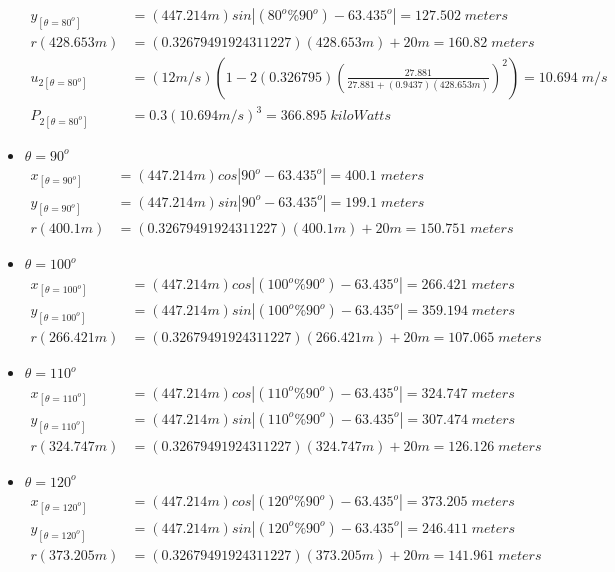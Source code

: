 \begin{itemize}
\begin{align*}
		y_{[\theta=80^o]} &=(447.214m) sin\left| (80^o\%90^o) - 63.435^o \right|  =127.502\;meters \\
		r(428.653m) &=(0.32679491924311227)(428.653m)+20m  =160.82\;meters\\
		u_{2[\theta=80^o]} &=(12m/s)\left( 1-2(0.326795)\left( \frac{27.881}{27.881+(0.9437)(428.653m)} \right)^2 \right) =10.694\;m/s \\
		P_{2[\theta=80^o]} &=0.3(10.694m/s)^3  =366.895\;kiloWatts
\end{align*}
\item $\theta=90^o$
	\begin{align*}%
		x_{[\theta=90^o]} &=(447.214m) cos\left| 90^o - 63.435^o \right|  =400.1\;meters \\
		y_{[\theta=90^o]} &=(447.214m) sin\left| 90^o - 63.435^o \right|  =199.1\;meters \\
		r(400.1m) &=(0.32679491924311227)(400.1m)+20m  =150.751\;meters\end{align*}
\item $\theta=100^o$
	\begin{align*}%
		x_{[\theta=100^o]} &=(447.214m) cos\left| (100^o\%90^o) - 63.435^o \right|  =266.421\;meters \\
		y_{[\theta=100^o]} &=(447.214m) sin\left| (100^o\%90^o) - 63.435^o \right|  =359.194\;meters \\
		r(266.421m) &=(0.32679491924311227)(266.421m)+20m  =107.065\;meters\end{align*}
\item $\theta=110^o$
	\begin{align*}%
		x_{[\theta=110^o]} &=(447.214m) cos\left| (110^o\%90^o) - 63.435^o \right|  =324.747\;meters \\
		y_{[\theta=110^o]} &=(447.214m) sin\left| (110^o\%90^o) - 63.435^o \right|  =307.474\;meters \\
		r(324.747m) &=(0.32679491924311227)(324.747m)+20m  =126.126\;meters\end{align*}
\item $\theta=120^o$
	\begin{align*}%
		x_{[\theta=120^o]} &=(447.214m) cos\left| (120^o\%90^o) - 63.435^o \right|  =373.205\;meters \\
		y_{[\theta=120^o]} &=(447.214m) sin\left| (120^o\%90^o) - 63.435^o \right|  =246.411\;meters \\
		r(373.205m) &=(0.32679491924311227)(373.205m)+20m  =141.961\;meters\end{align*}

\end{itemize}
